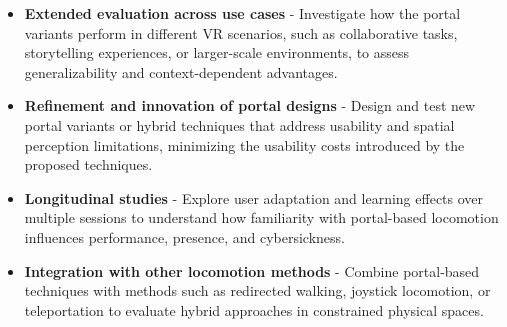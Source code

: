 \begin{itemize}
    \item \textbf{Extended evaluation across use cases} - Investigate how the portal variants perform in different \gls{VR} scenarios, 
    such as collaborative tasks, storytelling experiences, or larger-scale environments, to assess generalizability and context-dependent 
    advantages.

    \item \textbf{Refinement and innovation of portal designs} - Design and test new portal variants or hybrid techniques that 
    address usability and spatial perception limitations, minimizing the usability costs introduced by the proposed techniques.

    \item \textbf{Longitudinal studies} - Explore user adaptation and learning effects over multiple sessions to understand how 
    familiarity with portal-based locomotion influences performance, presence, and cybersickness.

    \item \textbf{Integration with other locomotion methods} - Combine portal-based techniques with methods such as redirected walking,
    joystick locomotion, or teleportation to evaluate hybrid approaches in constrained physical spaces.

\end{itemize}

